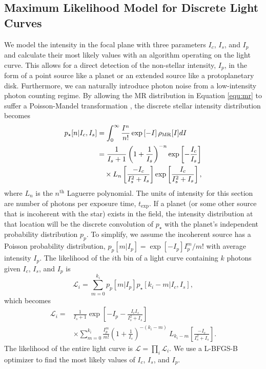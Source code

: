\documentclass[../main.tex]{subfiles}
\begin{document}
\subsection{Maximum Likelihood Model for Discrete Light Curves}

We model the intensity in the focal plane with three parameters $I_c$, $I_s$, and $I_p$ and calculate their most likely values with an algorithm operating on the light curve. This allows for a direct detection of the non-stellar intensity, $I_p$, in the form of a point source like a planet or an extended source like a protoplanetary disk. Furthermore, we can naturally introduce photon noise from a low-intensity photon counting regime. By allowing the MR distribution in Equation \eqref{equ:mr} to suffer a Poisson-Mandel transformation \parencite{cagigal_1999, aime04b}, the discrete stellar intensity distribution becomes
\begin{align}
p_\star [ n| I_c,I_s] &=\int_{0}^{\infty} \frac{I^n}{n!}\exp\left[-I\right]\rho_{\rm MR}[I]dI \nonumber\\
&= \frac{1}{I_s + 1}\left( 1 + \frac{1}{I_s} \right)^{-n} \exp\left[ -\frac{I_c}{I_s} \right] \nonumber \\ & \quad \times L_n\left[ \frac{-I_c}{I_s^2 + I_s} \right] \exp\left[  \frac{I_c}{I_s^2 + I_s}  \right],
\end{align}
where $L_n$ is the $n^{\mathrm{th}}$ Laguerre polynomial. The units of intensity for this section are number of photons per exposure time, $t_\mathrm{exp}$. If a planet (or some other source that is incoherent with the star) exists in the field, the intensity distribution at that location will be the discrete convolution of $p_\star$ with the planet's independent probability distribution $p_p$. To simplify, we assume the incoherent source has a Poisson probability distribution, $p_p [m | I_p] = \exp\left[ -I_p \right] I_p^m/m! $ with average intensity $I_p$. The likelihood of the $i$th bin of a light curve containing $k$ photons given $I_c$, $I_s$, and $I_p$ is 
\begin{equation}
\mathcal{L}_i = \sum_{m=0}^{k_i} p_p[m|I_p]p_\star[k_i-m|I_c,I_s],
\end{equation}
which becomes
\begin{align}
\label{equ:binnedLogL}
\mathcal{L}_i  =  &\frac{1}{I_s + 1} \exp\left[ -I_p -\frac{I_c I_s}{I_s^2 + I_s}  \right] \nonumber \\ &\times \sum_{m=0}^{k_i}  \frac{I_p^m}{m!} \left( 1 + \frac{1}{I_s} \right)^{-(k_i-m)} \ L_{k_i-m}\left[ \frac{-I_c}{I_s^2 + I_s} \right].
\end{align}
The likelihood of the entire light curve is $ \mathcal{L} = \prod_i \mathcal{L}_i$. We use a L-BFGS-B optimizer to find the most likely values of $I_c$, $I_s$, and $I_p$. 
\end{document}
